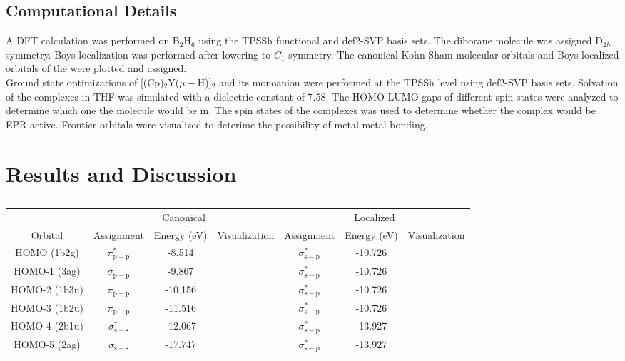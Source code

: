 \documentclass{article}
\begin{document}
\subsection{Computational Details}
A DFT calculation was performed on B$_2$H$_6$ using the TPSSh functional and
def2-SVP basis sets.  The diborane molecule was assigned D$_{2h}$ symmetry.
Boys localization was performed after lowering to $C_1$ symmetry.  The canonical
Kohn-Sham molecular orbitals and Boys localized orbitals of the  were plotted and
assigned. \\
Ground state optimizations of [(Cp)$_2$Y($\mu - $H)]$_2$ and its monoanion were
performed at the TPSSh level using def2-SVP basis sets.  Solvation of the
complexes in THF was simulated with a dielectric constant of $7.58$.  The
HOMO-LUMO gaps of different spin states were analyzed to determine which one the
molecule would be in.  The spin states of the complexes was used to determine
whether the complex would be EPR active.  Frontier orbitals were visualized to
deterime the possibility of metal-metal bonding. 

\section{Results and Discussion} %

\begin{table}[htbp]
    \centering
    \caption{}
    \begin{tabular}{c|ccc|ccc}
	    & \multicolumn{3}{c}{Canonical} & \multicolumn{3}{c}{Localized} \\
	Orbital & Assignment & Energy (eV) & Visualization & Assignment & Energy (eV) & Visualization \\
	    \hline
      HOMO (1b2g)   &  $\pi^*_{\mathrm{p-p}}$     &   -8.514      &
	    &  $\sigma^*_{\mathrm{s-p}}$  &  -10.726  \\
      HOMO-1 (3ag)  &  $\sigma_{\mathrm{p-p}}$    &   -9.867      &
	    &  $\sigma^*_{\mathrm{s-p}}$  &  -10.726  \\
      HOMO-2 (1b3u) &  $\pi_{\mathrm{p-p}}$       &  -10.156      &
	    &  $\sigma^*_{\mathrm{s-p}}$  &  -10.726  \\
      HOMO-3 (1b2u) &  $\pi_{\mathrm{p-p}}$       &  -11.516      &
	    &  $\sigma^*_{\mathrm{s-p}}$  &  -10.726  \\
      HOMO-4 (2b1u) &  $\sigma^*_{\mathrm{s-s}}$  &  -12.067      &
	    &  $\sigma^*_{\mathrm{s-p}}$  &  -13.927  \\
      HOMO-5 (2ag)  &  $\sigma_{\mathrm{s-s}}$    &  -17.747      &
	    &  $\sigma^*_{\mathrm{s-p}}$  &  -13.927  
    \end{tabular}
\end{table}
\end{document}
